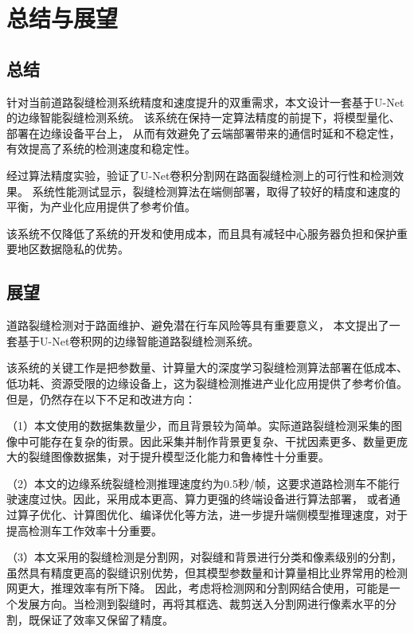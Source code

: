 \chapter{总结与展望}

\section{总结}
针对当前道路裂缝检测系统精度和速度提升的双重需求，本文设计一套基于U-Net的边缘智能裂缝检测系统。
该系统在保持一定算法精度的前提下，将模型量化、部署在边缘设备平台上，
从而有效避免了云端部署带来的通信时延和不稳定性，有效提高了系统的检测速度和稳定性。

经过算法精度实验，验证了U-Net卷积分割网在路面裂缝检测上的可行性和检测效果。
系统性能测试显示，裂缝检测算法在端侧部署，取得了较好的精度和速度的平衡，为产业化应用提供了参考价值。

该系统不仅降低了系统的开发和使用成本，而且具有减轻中心服务器负担和保护重要地区数据隐私的优势。

\section{展望}
道路裂缝检测对于路面维护、避免潜在行车风险等具有重要意义，
本文提出了一套基于U-Net卷积网的边缘智能道路裂缝检测系统。

该系统的关键工作是把参数量、计算量大的深度学习裂缝检测算法部署在低成本、低功耗、资源受限的边缘设备上，这为裂缝检测推进产业化应用提供了参考价值。
但是，仍然存在以下不足和改进方向：

（1）本文使用的数据集数量少，而且背景较为简单。实际道路裂缝检测采集的图像中可能存在复杂的街景。因此采集并制作背景更复杂、干扰因素更多、数量更庞大的裂缝图像数据集，对于提升模型泛化能力和鲁棒性十分重要。

（2）本文的边缘系统裂缝检测推理速度约为0.5秒/帧，这要求道路检测车不能行驶速度过快。因此，采用成本更高、算力更强的终端设备进行算法部署，
或者通过算子优化、计算图优化、编译优化等方法，进一步提升端侧模型推理速度，对于提高检测车工作效率十分重要。

（3）本文采用的裂缝检测是分割网，对裂缝和背景进行分类和像素级别的分割，虽然具有精度更高的裂缝识别优势，但其模型参数量和计算量相比业界常用的检测网更大，推理效率有所下降。
因此，考虑将检测网和分割网结合使用，可能是一个发展方向。当检测到裂缝时，再将其框选、裁剪送入分割网进行像素水平的分割，既保证了效率又保留了精度。